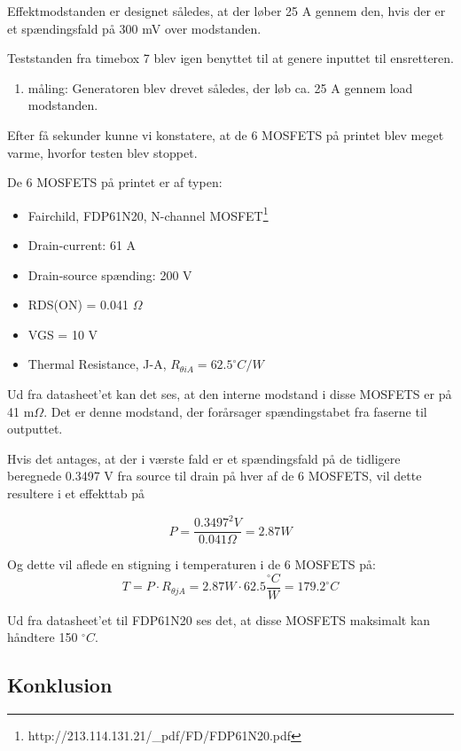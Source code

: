Effektmodstanden er designet således, at der løber 25 A gennem den, hvis der er et spændingsfald på 300 mV over modstanden.  

Teststanden fra timebox 7 blev igen benyttet til at genere inputtet til ensretteren.

\begin{enumerate}
\item måling: Generatoren blev drevet således, der løb ca. 25 A gennem load modstanden.
\end{enumerate}
Efter få sekunder kunne vi konstatere, at de 6 MOSFETS på printet blev meget varme, hvorfor testen blev stoppet. 

De 6 MOSFETS på printet er af typen:
\begin{itemize}
\item Fairchild, FDP61N20, N-channel MOSFET\footnote{http://213.114.131.21/_pdf/FD/FDP61N20.pdf}
\item Drain-current: 61 A
\item Drain-source spænding: 200 V
\item RDS(ON) = 0.041 $\Omega$
\item VGS = 10 V
\item Thermal Resistance, J-A, $R_{\theta iA} = 62.5^\circ C/W$
\end{itemize}

Ud fra datasheet’et kan det ses, at den interne modstand i disse MOSFETS er på 41 m$\Omega$. Det er denne modstand, der forårsager spændingstabet fra faserne til outputtet. 

Hvis det antages, at der i værste fald er et spændingsfald på de tidligere beregnede 0.3497 V fra source til drain på hver af de 6 MOSFETS, vil dette resultere i et effekttab på 

\begin{equation}
  \label{eq:1}
  P = \frac{0.3497^2V}{0.041 \Omega}=2.87W
\end{equation}

Og dette vil aflede en stigning i temperaturen i de 6 MOSFETS på:
\begin{equation}
  \label{eq:2}
  T = P \cdot R_{\theta jA}=2.87 W\cdot 62.5 \frac{^\circ C}{W} = 179.2 ^\circ C
\end{equation}

Ud fra datasheet’et til FDP61N20 ses det, at disse MOSFETS maksimalt kan håndtere 150 $^\circ C$.

\subsection{Konklusion}
\label{sec:konklusion}

